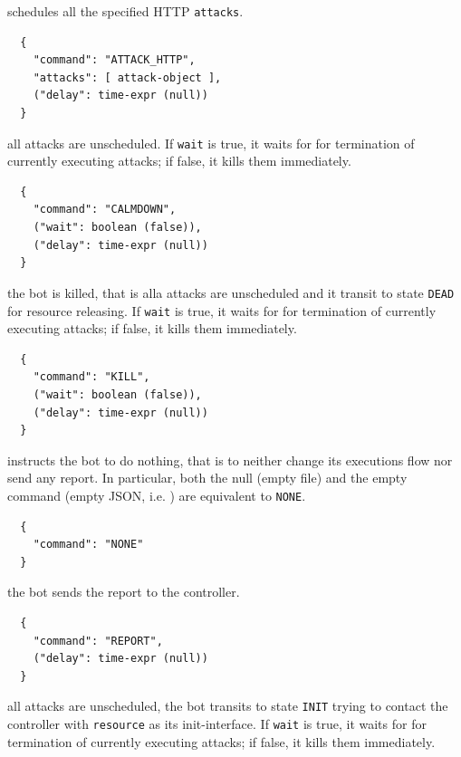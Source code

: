 \begin{description}
  \setlength\itemsep{1em}

  \item[ATTACK-HTTP] schedules all the specified HTTP \texttt{attacks}.

  \begin{verbatim}
  {
    "command": "ATTACK_HTTP",
    "attacks": [ attack-object ],
    ("delay": time-expr (null))
  }
  \end{verbatim}

  \item[CALMDOWN] all attacks are unscheduled.
  If \texttt{wait} is true, it waits for for termination of currently executing attacks; if false, it kills them immediately.

  \begin{verbatim}
  {
    "command": "CALMDOWN",
    ("wait": boolean (false)),
    ("delay": time-expr (null))
  }
  \end{verbatim}

  \item[KILL] the bot is killed, that is alla attacks are unscheduled and it transit to state \texttt{DEAD} for resource releasing.
  If \texttt{wait} is true, it waits for for termination of currently executing attacks; if false, it kills them immediately.

  \begin{verbatim}
  {
    "command": "KILL",
    ("wait": boolean (false)),
    ("delay": time-expr (null))
  }
  \end{verbatim}

  \item[NONE] instructs the bot to do nothing, that is to neither change its executions flow nor send any report. In particular, both the null (empty file) and the empty command (empty JSON, i.e. {}) are equivalent to \texttt{NONE}.

  \begin{verbatim}
  {
    "command": "NONE"
  }
  \end{verbatim}

  \item[REPORT] the bot sends the report to the controller.

  \begin{verbatim}
  {
    "command": "REPORT",
    ("delay": time-expr (null))
  }
  \end{verbatim}

  \item[RESTART] all attacks are unscheduled, the bot transits to state \texttt{INIT} trying to contact the controller with \texttt{resource} as its init-interface.
  If \texttt{wait} is true, it waits for for termination of currently executing attacks; if false, it kills them immediately.


\end{description}
